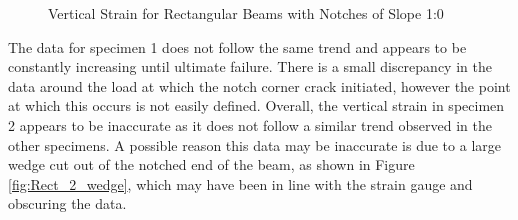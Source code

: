 \documentclass[11pt,a4paper]{article}
\numberwithin{equation}{subsection}
\begin{document}
\begin{figure}[h]
	\begin{center}
	\end{center}
	\caption{Vertical Strain for Rectangular Beams with Notches of Slope 1:0}
	\label{fig:Rect_10_Y}
\end{figure}
\pagebreak

\noindent
The data for specimen 1 does not follow the same trend and appears to be constantly increasing until ultimate failure. There is a small discrepancy in the data around the load at which the notch corner crack initiated, however the point at which this occurs is not easily defined. Overall, the vertical strain in specimen 2 appears to be inaccurate as it does not follow a similar trend observed in the other specimens. A possible reason this data may be inaccurate is due to a large wedge cut out of the notched end of the beam, as shown in Figure \ref{fig:Rect_2_wedge}, which may have been in line with the strain gauge and obscuring the data. 
\vspace*{\baselineskip}
\end{document}
